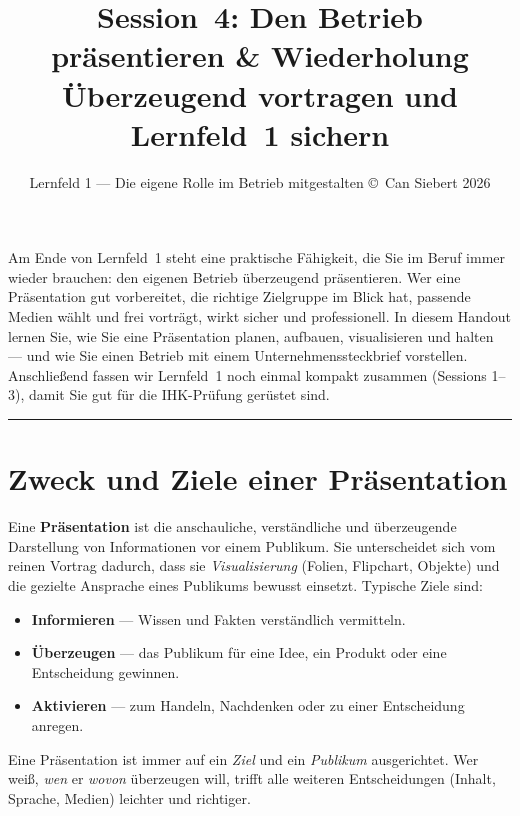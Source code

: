 \documentclass[11pt, a4paper]{article}
\title{\vspace*{-1.5cm}\Huge\bfseries\color{bfwPrimaryDark}Session~4: Den Betrieb präsentieren \& Wiederholung\\[0.4em]
  \large\color{bfwInkSoft}\textnormal{Überzeugend vortragen und Lernfeld~1 sichern}}
\author{\textsf{Lernfeld 1 --- Die eigene Rolle im Betrieb mitgestalten \textperiodcentered{} \small\copyright\ Can Siebert\,\textperiodcentered\,2026}}
\date{}
\begin{document}
\maketitle
\thispagestyle{empty}

\vspace{1em}
\begin{merksatz}[title={\bfseries Worum geht es in dieser Session?}]
Am Ende von Lernfeld~1 steht eine praktische Fähigkeit, die Sie im Beruf immer wieder
brauchen: den eigenen Betrieb überzeugend präsentieren. Wer eine Präsentation gut
vorbereitet, die richtige Zielgruppe im Blick hat, passende Medien wählt und frei
vorträgt, wirkt sicher und professionell. In diesem Handout lernen Sie, wie Sie eine
Präsentation planen, aufbauen, visualisieren und halten --- und wie Sie einen Betrieb
mit einem Unternehmenssteckbrief vorstellen. Anschließend fassen wir Lernfeld~1 noch
einmal kompakt zusammen (Sessions 1--3), damit Sie gut für die IHK-Prüfung gerüstet sind.
\end{merksatz}

\tableofcontents
\vspace{1em}
\hrule
\vspace{1em}

\section{Zweck und Ziele einer Präsentation}

Eine \textbf{Präsentation} ist die anschauliche, verständliche und überzeugende
Darstellung von Informationen vor einem Publikum. Sie unterscheidet sich vom reinen
Vortrag dadurch, dass sie \emph{Visualisierung} (Folien, Flipchart, Objekte) und die
gezielte Ansprache eines Publikums bewusst einsetzt. Typische Ziele sind:

\begin{itemize}
  \item \textbf{Informieren} --- Wissen und Fakten verständlich vermitteln.
  \item \textbf{Überzeugen} --- das Publikum für eine Idee, ein Produkt oder eine Entscheidung gewinnen.
  \item \textbf{Aktivieren} --- zum Handeln, Nachdenken oder zu einer Entscheidung anregen.
\end{itemize}

\begin{merksatz}
Eine Präsentation ist immer auf ein \emph{Ziel} und ein \emph{Publikum} ausgerichtet.
Wer weiß, \emph{wen} er \emph{wovon} überzeugen will, trifft alle weiteren Entscheidungen
(Inhalt, Sprache, Medien) leichter und richtiger.
\end{merksatz}
\end{document}
